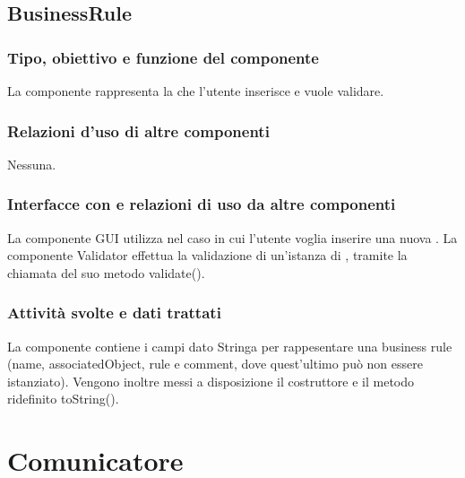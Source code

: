 \documentclass[11pt,titlepage,a4paper]{report}
\begin{document}
\subsection{BusinessRule}
\subsubsection{Tipo, obiettivo e funzione del componente}
La componente \BR rappresenta la \br che l'utente inserisce e vuole validare.
\subsubsection{Relazioni d'uso di altre componenti}
Nessuna.
\subsubsection{Interfacce con e relazioni di uso da altre componenti}
La componente GUI utilizza \BR nel caso in cui l'utente voglia inserire una nuova \br.
La componente Validator effettua la validazione di un'istanza di \BR, tramite la chiamata del suo metodo validate().
\subsubsection{Attivit\`a svolte e dati trattati}
La componente contiene i campi dato Stringa per rappesentare una business rule (name, associatedObject, rule e comment, dove quest'ultimo pu\`o non essere istanziato). Vengono inoltre messi a disposizione il costruttore e il metodo ridefinito toString().

\section{Comunicatore}
\end{document}
